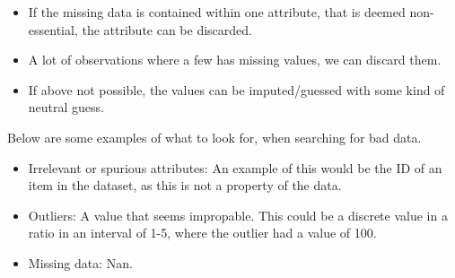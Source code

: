 \documentclass{article}
\begin{document}
\begin{itemize}
    \item If the missing data is contained within one attribute, that is deemed non-essential, the attribute can be discarded.
    \item A lot of observations where a few has missing values, we can discard them.
    \item If above not possible, the values can be imputed/guessed with some kind of neutral guess.
\end{itemize}

Below are some examples of what to look for, when searching for bad data.

\begin{itemize}
    \item Irrelevant or spurious attributes: An example of this would be the ID of an item in the dataset, as this is not a property of the data.
    \item Outliers: A value that seems impropable. This could be a discrete value in a ratio in an interval of 1-5, where the outlier had a value of 100.
    \item Missing data: Nan.
\end{itemize}

\newpage


\end{document}
